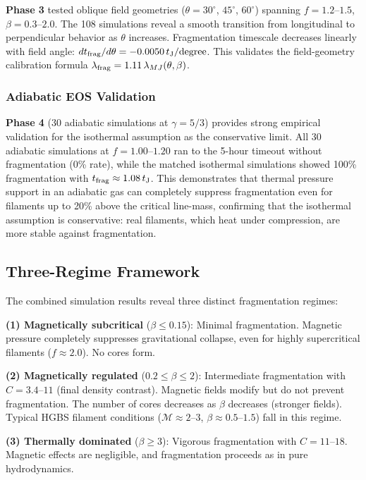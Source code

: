 \documentclass[twoside,twocolumn]{mnras}
\begin{document}
\textbf{Phase 3} tested oblique field geometries ($\theta = 30^\circ$, $45^\circ$, $60^\circ$) spanning $f = 1.2$--$1.5$, $\beta = 0.3$--$2.0$. The 108 simulations reveal a smooth transition from longitudinal to perpendicular behavior as $\theta$ increases. Fragmentation timescale decreases linearly with field angle: $dt_{\rm frag}/d\theta = -0.0050\,t_{\rm J}/{\rm degree}$. This validates the field-geometry calibration formula $\lambda_{\rm frag} = 1.11\,\lambda_{MJ}(\theta, \beta)$.

\subsubsection{Adiabatic EOS Validation}

\textbf{Phase 4} (30 adiabatic simulations at $\gamma = 5/3$) provides strong empirical validation for the isothermal assumption as the conservative limit. All 30 adiabatic simulations at $f = 1.00$--$1.20$ ran to the 5-hour timeout without fragmentation (0\% rate), while the matched isothermal simulations showed 100\% fragmentation with $t_{\rm frag} \approx 1.08\,t_{\rm J}$. This demonstrates that thermal pressure support in an adiabatic gas can completely suppress fragmentation even for filaments up to 20\% above the critical line-mass, confirming that the isothermal assumption is conservative: real filaments, which heat under compression, are more stable against fragmentation.

\subsection{Three-Regime Framework}

The combined simulation results reveal three distinct fragmentation regimes:

\textbf{(1) Magnetically subcritical} ($\beta \leq 0.15$): Minimal fragmentation. Magnetic pressure completely suppresses gravitational collapse, even for highly supercritical filaments ($f \approx 2.0$). No cores form.

\textbf{(2) Magnetically regulated} ($0.2 \leq \beta \leq 2$): Intermediate fragmentation with $C = 3.4$--$11$ (final density contrast). Magnetic fields modify but do not prevent fragmentation. The number of cores decreases as $\beta$ decreases (stronger fields). Typical HGBS filament conditions ($\mathcal{M} \approx 2$--$3$, $\beta \approx 0.5$--$1.5$) fall in this regime.

\textbf{(3) Thermally dominated} ($\beta \geq 3$): Vigorous fragmentation with $C = 11$--$18$. Magnetic effects are negligible, and fragmentation proceeds as in pure hydrodynamics.
\end{document}
